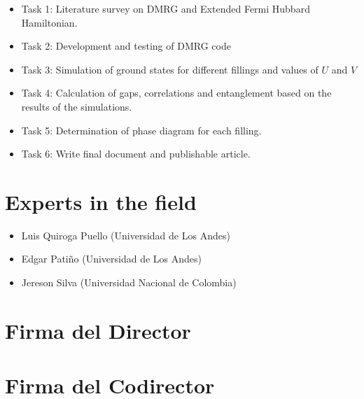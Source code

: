 \documentclass{article}
\begin{document}
\begin{itemize}
	\item Task 1: Literature survey on DMRG and Extended Fermi Hubbard Hamiltonian.
	\item Task 2: Development and testing of DMRG code 
	\item Task 3: Simulation of ground states for different fillings and values of $U$ and $V$
	\item Task 4: Calculation of gaps, correlations and entanglement based on the results of the simulations.
	\item Task 5: Determination of phase diagram for each filling.
	\item Task 6: Write final document and publishable article.
\end{itemize}

\section{Experts in the field}

\begin{itemize}
    \item Luis Quiroga Puello (Universidad de Los Andes)
    \item Edgar Patiño (Universidad de Los Andes)
    \item Jereson Silva (Universidad Nacional de Colombia)
\end{itemize}

\section*{Firma del Director}
\vspace{1.5cm}

\section*{Firma del Codirector}
\vspace{1.5cm}



\end{document}
